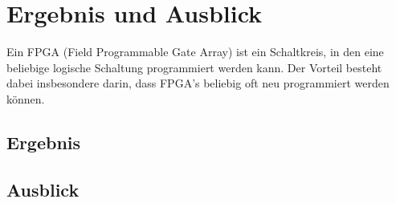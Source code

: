 \chapter{Ergebnis und Ausblick} %
\label{Ergebnis} %

Ein FPGA (Field Programmable Gate Array) ist ein Schaltkreis, in den eine beliebige logische Schaltung programmiert werden kann. Der Vorteil besteht dabei insbesondere darin, dass FPGA's beliebig oft neu programmiert werden können. 

\section{Ergebnis}
\section{Ausblick}

